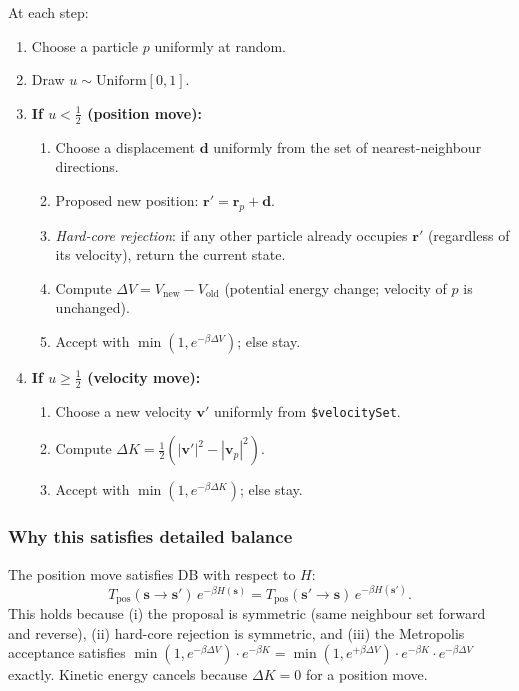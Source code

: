 \documentclass[12pt,a4paper]{article}
\begin{document}
At each step:
\begin{enumerate}
  \item Choose a particle $p$ uniformly at random.
  \item Draw $u \sim \mathrm{Uniform}[0,1]$.
  \item \textbf{If $u < \tfrac{1}{2}$ (position move):}
    \begin{enumerate}
      \item Choose a displacement $\mathbf{d}$ uniformly from the set of
        nearest-neighbour directions.
      \item Proposed new position: $\mathbf{r}' = \mathbf{r}_p + \mathbf{d}$.
      \item \emph{Hard-core rejection}: if any other particle already occupies
        $\mathbf{r}'$ (regardless of its velocity), return the current state.
      \item Compute $\Delta V = V_\text{new} - V_\text{old}$ (potential energy
        change; velocity of $p$ is unchanged).
      \item Accept with $\min(1, e^{-\beta \Delta V})$; else stay.
    \end{enumerate}
  \item \textbf{If $u \geq \tfrac{1}{2}$ (velocity move):}
    \begin{enumerate}
      \item Choose a new velocity $\mathbf{v}'$ uniformly from
        \texttt{\$velocitySet}.
      \item Compute $\Delta K = \tfrac{1}{2}(|\mathbf{v}'|^2 - |\mathbf{v}_p|^2)$.
      \item Accept with $\min(1, e^{-\beta \Delta K})$; else stay.
    \end{enumerate}
\end{enumerate}

\subsubsection*{Why this satisfies detailed balance}

The position move satisfies DB with respect to $H$:
\[
  T_{\text{pos}}(\mathbf{s} \to \mathbf{s}')\, e^{-\beta H(\mathbf{s})} =
  T_{\text{pos}}(\mathbf{s}' \to \mathbf{s})\, e^{-\beta H(\mathbf{s}')}.
\]
This holds because (i) the proposal is symmetric (same neighbour set forward
and reverse), (ii) hard-core rejection is symmetric, and (iii) the Metropolis
acceptance satisfies $\min(1, e^{-\beta \Delta V}) \cdot e^{-\beta K} =
\min(1, e^{+\beta \Delta V}) \cdot e^{-\beta K} \cdot e^{-\beta \Delta V}$
exactly.  Kinetic energy cancels because $\Delta K = 0$ for a position move.
\end{document}
